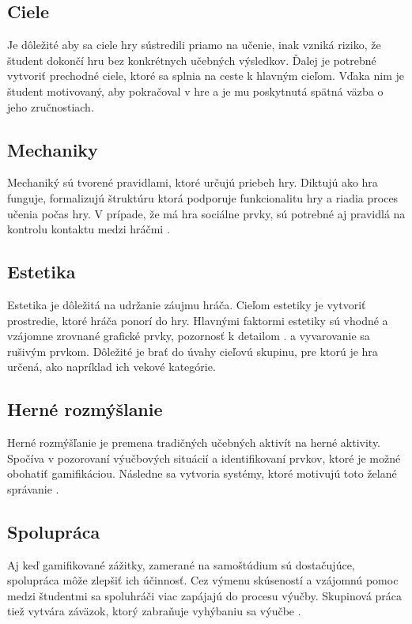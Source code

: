 \documentclass[10pt,twoside,slovak,a4paper]{article}
\begin{document}
\subsection{Ciele}

Je dôležité aby sa ciele hry sústredili priamo na učenie, inak vzniká riziko, že študent dokončí hru bez konkrétnych učebných výsledkov. Ďalej je potrebné vytvoriť prechodné ciele, ktoré sa splnia na ceste k hlavným cieľom. Vďaka nim je študent motivovaný, aby pokračoval v hre a je mu poskytnutá spätná väzba o jeho zručnostiach.

\subsection{Mechaniky}

Mechaniký sú tvorené pravidlami, ktoré určujú priebeh hry. Diktujú ako hra funguje, formalizujú štruktúru ktorá podporuje funkcionalitu hry a riadia proces učenia počas hry. V prípade, že má hra sociálne prvky, sú potrebné aj pravidlá na kontrolu kontaktu medzi hráčmi \cite{Rego}.

\subsection{Estetika}

Estetika je dôležitá na udržanie záujmu hráča. Cieľom estetiky je vytvoriť prostredie, ktoré hráča ponorí do hry. Hlavnými faktormi estetiky sú vhodné a vzájomne zrovnané grafické prvky, pozornosť k detailom \cite{Kapp}. a vyvarovanie sa rušivým prvkom. Dôležité je brať do úvahy cieľovú skupinu, pre ktorú je hra určená, ako napríklad ich vekové kategórie. \cite{Rego}

\subsection{Herné rozmýšlanie}

Herné rozmýšľanie je premena tradičných učebných aktivít na herné aktivity. Spočíva v pozorovaní výučbových situácií a identifikovaní prvkov, ktoré je možné obohatiť gamifikáciou. Následne sa vytvoria systémy, ktoré motivujú toto želané správanie \cite{Werbach+Hunter}.

\subsection{Spolupráca}

Aj keď gamifikované zážitky, zamerané na samoštúdium sú dostačujúce, spolupráca môže zlepšiť ich účinnosť. Cez výmenu skúseností a vzájomnú pomoc medzi študentmi sa spoluhráči viac zapájajú do procesu výučby. Skupinová práca tiež vytvára záväzok, ktorý zabraňuje vyhýbaniu sa výučbe \cite{Rego}.
\end{document}
